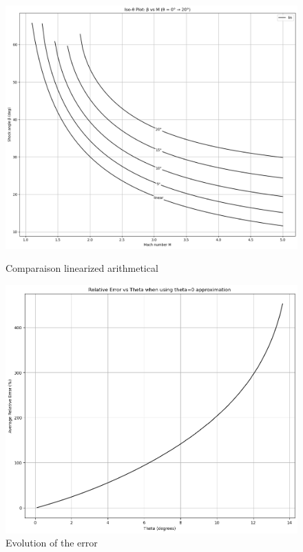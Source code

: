 \begin{figure}[H]
    \centering
    \begin{minipage}[b]{0.45\linewidth}
        \centering
        \includegraphics[width=\linewidth]{ressources/figures/linear_comparaison.png}
		\caption{Comparaison linearized arithmetical}
    \end{minipage}
    \begin{minipage}[b]{0.45\linewidth}
        \centering
        \includegraphics[width=\linewidth]{ressources/figures/linear_error.png}
		\caption{Evolution of the error}
    \end{minipage}
    \label{fig:linear_comparaison}
\end{figure}

